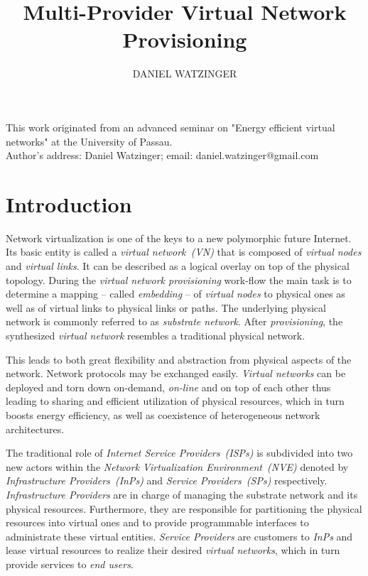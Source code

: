 \documentclass[prodmode,acmtomccap]{acmlarge}
\title{Multi-Provider Virtual Network Provisioning}
\author{DANIEL WATZINGER\affil{University of Passau}}
\begin{document}
\begin{bottomstuff}
This work originated from an advanced seminar on "Energy efficient virtual networks" at the University of Passau.\\
Author's address: Daniel Watzinger; email: daniel.watzinger@gmail.com
\end{bottomstuff}
\maketitle

\section{Introduction}
\label{sec:introduction}

Network virtualization is one of the keys to a new polymorphic future Internet. Its basic entity is called a 
\emph{virtual network~(VN)} that is composed of \emph{virtual nodes} and \emph{virtual links}. It can be described as
a logical overlay on top of the physical topology.
During the \emph{virtual network provisioning} work-flow the main task is to determine a mapping 
-- called \emph{embedding} -- of \emph{virtual nodes} to physical ones as well as of virtual links to physical links or paths.
The underlying physical network is commonly referred to as \emph{substrate network}.
After \emph{provisioning}, the synthesized \emph{virtual network} resembles a traditional physical network.

This leads to both great flexibility and abstraction from physical aspects of the network. Network protocols may be exchanged easily. 
\emph{Virtual networks} can be deployed and torn down on-demand, 
\emph{on-line} and on top of each other thus leading to sharing and efficient utilization of physical resources, which in turn boosts energy efficiency, 
as well as coexistence of heterogeneous network architectures.

The traditional role of \emph{Internet Service Providers~(ISPs)} is subdivided into two new actors within the \emph{Network Virtualization Environment~(NVE)} denoted by 
\emph{Infrastructure Providers~(InPs)} and \emph{Service Providers~(SPs)} respectively.
\emph{Infrastructure Providers} are in charge of managing the substrate network and its physical resources. Furthermore, they are responsible for partitioning the physical resources
into virtual ones and to provide programmable interfaces to administrate these virtual entities.
\emph{Service Providers} are customers to \emph{InPs} and lease virtual resources to realize their desired \emph{virtual networks}, which in turn provide services to \emph{end users}.
\end{document}
